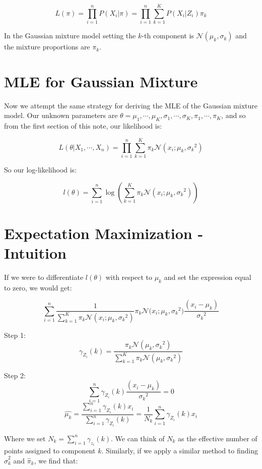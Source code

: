 \documentclass{article}
\begin{document}
\[
L(\pi) = \prod_{i=1}^{n} P(X_i | \pi) = \prod_{i=1}^{n} \sum_{k=1}^{K} P(X_i | Z_i) \pi_k
\]

In the Gaussian mixture model setting the $k$-th component is $\mathcal{N}(\mu_k,\sigma_k)$ and the mixture proportions are $\pi_k$.

\section{MLE for Gaussian Mixture}

Now we attempt the same strategy for deriving the MLE of the Gaussian mixture model. Our unknown parameters are $\theta={\mu_1,\cdots,\mu_K,\sigma_1,\cdots,\sigma_K,\pi_1,\cdots,\pi_K}$, and so from the first section of this note, our likelihood is:

\[
L(\theta | X_1, \cdots ,X_n) =  \prod_{i=1}^{n} \sum_{k=1}^{K}  \pi_k \mathcal{N} (x_i ; \mu_k, {\sigma_k}^2)
\]

So our log-likelihood is:

\[
l(\theta) = \sum_{i=1}^{n} \log \left( \sum_{k=1}^{K}  \pi_k \mathcal{N} (x_i ; \mu_k, {\sigma_k}^2) \right)
\]

\section{Expectation Maximization - Intuition}
If we were to differentiate $l(\theta)$ with respect to $\mu_k$ and set the expression equal to zero, we would get:

\[
\sum_{i=1}^{n} \frac{1}{\sum_{k=1}^{K}  \pi_k \mathcal{N} (x_i ; \mu_k, {\sigma_k}^2)} {\pi_k \mathcal{N} (x_i ; \mu_k, {\sigma_k}^2}) \frac{\left(x_i - \mu_k\right)}{{\sigma_k}^2}
\]


Step 1:\\
\[
\gamma_{Z_i} (k) =  \frac{\pi_k \mathcal{N} (\mu_k, {\sigma_k}^2)}{\sum_{k=1}^{K}  \pi_k \mathcal{N} (\mu_k, {\sigma_k}^2)} {}
\]

Step 2:\\
\[
\sum_{i=1}^{n} \gamma_{Z_i} (k) \frac{\left(x_i - \mu_k\right)}{{\sigma_k}^2} = 0
\]
\[
\hat{\mu_k} = \frac{\sum_{i=1}^{n} \gamma_{Z_i} (k) x_i}{\sum_{i=1}^{n} \gamma_{Z_i} (k)} = \frac{1}{N_k} \sum_{i=1}^{n} \gamma_{Z_i} (k) x_i
\]

Where we set $N_k=\sum_{i=1}^{n}\gamma_{z_i}(k)$. We can think of $N_k$ as the effective number of points assigned to component $k$.
Similarly, if we apply a similar method to finding $\hat{\sigma}^{2}_{k}$ and $\hat{\pi}_{k}$, we find that:
\end{document}

